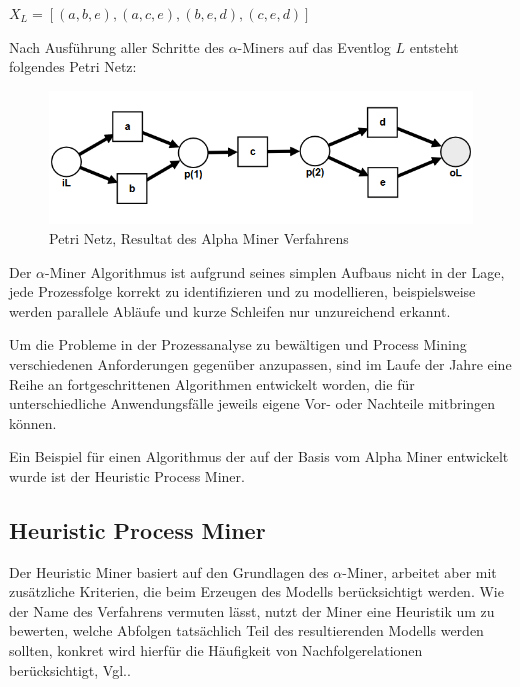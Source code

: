 $ X_L={ [({a}, {b, e}), ({a}, {c, e}),
({b, e}, {d}), ({c, e}, {d}) ]}$

Nach Ausführung aller Schritte des $\alpha$-Miners auf das Eventlog $L$ entsteht folgendes Petri Netz:

\begin{figure}[!h]
    \centering
    \includegraphics[scale=0.65]{figures/Appbildungen/alpha_petri_net.png}
    \caption{Petri Netz, Resultat des Alpha Miner Verfahrens}
    \label{fig:petriNetExample}
\end{figure}

Der $\alpha$-Miner Algorithmus ist aufgrund seines simplen Aufbaus nicht in der Lage, jede Prozessfolge korrekt zu identifizieren und zu modellieren, beispielsweise werden parallele Abläufe und kurze Schleifen nur unzureichend erkannt.

Um die Probleme in der Prozessanalyse zu bewältigen und Process Mining verschiedenen Anforderungen gegenüber anzupassen, sind im Laufe der Jahre eine Reihe an fortgeschrittenen Algorithmen entwickelt worden, die für unterschiedliche Anwendungsfälle jeweils eigene Vor- oder Nachteile mitbringen können. 

Ein Beispiel für einen Algorithmus der auf der Basis vom Alpha Miner entwickelt wurde ist der Heuristic Process Miner.

\subsection{Heuristic Process Miner}
Der Heuristic Miner basiert auf den Grundlagen des $\alpha$-Miner, arbeitet aber mit zusätzliche Kriterien, die beim Erzeugen des Modells berücksichtigt werden. Wie der Name des Verfahrens vermuten lässt, nutzt der Miner eine Heuristik um zu bewerten, welche Abfolgen tatsächlich Teil des resultierenden Modells werden sollten, konkret wird hierfür die Häufigkeit von Nachfolgerelationen berücksichtigt, Vgl.\cite{heurMining}.

